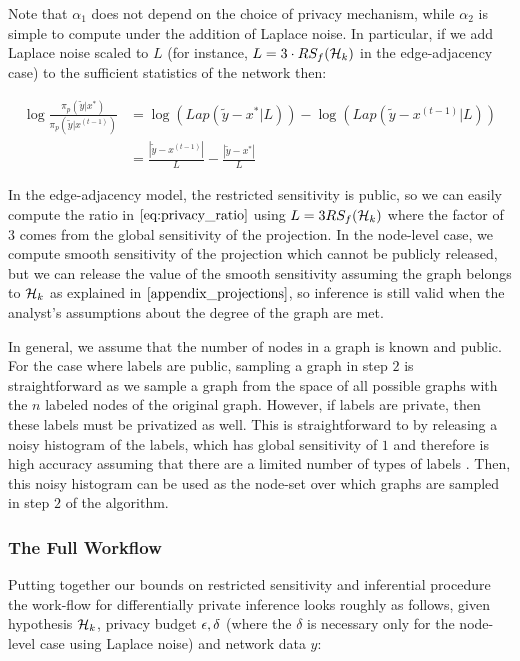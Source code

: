 Note that $\alpha_1$ does not depend on the choice of privacy mechanism, while $\alpha_2$ is simple to compute under the addition of Laplace noise. In particular, if we add Laplace noise scaled to $L$ (for instance, $L= 3 \cdot RS_f(\mathcal{H}_k)$ in the edge-adjacency case) to the sufficient statistics of the network then:

\begin{align}
\label{eq:privacy_ratio}
\log \frac{\pi_p(\tilde{y} | x^*) }{\pi_p(\tilde{y} | x^{(t-1)})} & = \log \left(Lap\left(\tilde{y} - x^*  | L \right)  \right) -  \log \left(Lap\left(\tilde{y} - x^{(t-1)}  | L \right) \right) \\ \nonumber
& = \frac{|\tilde{y} - x^{(t-1)} | }{L} - \frac{|\tilde{y} - x^* | }{L}
\end{align}

 In the edge-adjacency model, the restricted sensitivity is public, so  we can easily compute the ratio in $\cref{eq:privacy_ratio}$ using $L=3RS_f(\mathcal{H}_k)$ where the factor of $3$ comes from the global sensitivity of the projection. In the node-level case, we compute smooth sensitivity of the projection which cannot be publicly released, but we can release the value of the smooth sensitivity assuming the graph belongs to $\mathcal{H}_k$ as explained in $\Cref{appendix_projections}$, so inference is still valid when the analyst's assumptions about the degree of the graph are met.
 
 In general, we assume that the number of nodes in a graph is known and public. For the case where labels are public, sampling a graph in step $2$ is straightforward as we sample a graph from the space of all possible graphs with the $n$ labeled nodes of the original graph. However, if labels are private, then these labels must be privatized as well. This is straightforward to by releasing a noisy histogram of the labels, which has global sensitivity of $1$ and therefore is high accuracy assuming that there are a limited number of types of labels \cite{DMNS06}. Then, this noisy histogram can be used as the node-set over which graphs are sampled in step $2$ of the algorithm.

\subsubsection{The Full Workflow}

Putting together our bounds on restricted sensitivity and inferential procedure the work-flow for differentially private inference looks roughly as follows, given hypothesis $\mathcal{H}_k$, privacy budget $\epsilon, \delta$ (where the $\delta$ is necessary only for the node-level case using Laplace noise) and network data $y$:

